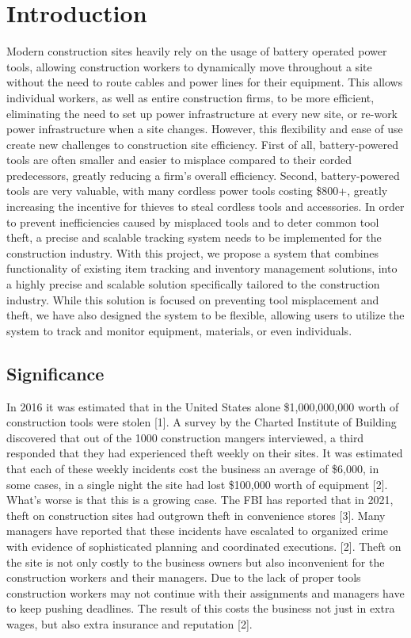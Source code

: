 \documentclass[conference]{IEEEtran}
\begin{document}
\section{Introduction}
Modern construction sites heavily rely on the usage of battery operated 
power tools, allowing construction workers to dynamically move throughout 
a site without the need to route cables and power lines for their 
equipment. This allows individual workers, as well as entire 
construction firms, to be more efficient, eliminating the need to set 
up power infrastructure at every new site, or re-work power infrastructure 
when a site changes. However, this flexibility and ease of use create new 
challenges to construction site efficiency. First of all, battery-powered 
tools are often smaller and easier to misplace compared to their corded 
predecessors, greatly reducing a firm’s overall efficiency. Second, 
battery-powered tools are very valuable, with many cordless power tools 
costing \$800+, greatly increasing the incentive for thieves to steal 
cordless tools and accessories. In order to prevent inefficiencies caused 
by misplaced tools and to deter common tool theft, a precise and scalable 
tracking system needs to be implemented for the construction industry. 
With this project, we propose a system that combines functionality of 
existing item tracking and inventory management solutions, into a highly 
precise and scalable solution specifically tailored to the construction 
industry. While this solution is focused on preventing tool misplacement 
and theft, we have also designed the system to be flexible, allowing 
users to utilize the system to track and monitor equipment, materials, 
or even individuals.

\subsection{Significance}

In 2016 it was estimated that in the United States alone \$1,000,000,000 
worth of construction tools were stolen [1]. A survey by the Charted 
Institute of Building discovered that out of the 1000 construction mangers 
interviewed, a third responded that they had experienced theft weekly on 
their sites. It was estimated that each of these weekly incidents cost the 
business an average of \$6,000, in some cases, in a single night the site 
had lost \$100,000 worth of equipment [2]. What’s worse is that this is a 
growing case. The FBI has reported that in 2021, theft on construction 
sites had outgrown theft in convenience stores [3]. Many managers have 
reported that these incidents have escalated to organized crime with 
evidence of sophisticated planning and coordinated executions. [2]. 
Theft on the site is not only costly to the business owners but also 
inconvenient for the construction workers and their managers. 
Due to the lack of proper tools construction workers may not continue with
their assignments and managers have to keep pushing deadlines. The 
result of this costs the business not just in extra wages, but also 
extra insurance and reputation [2]. 
\end{document}
